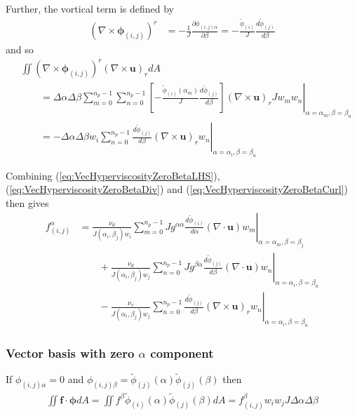 \documentclass{article}
\newcommand{\vb}{\mathbf}
\newcommand{\vg}{\boldsymbol}
\newcommand{\diff}[2]{\frac{d #1}{d #2}}
\newcommand{\pdiff}[2]{\frac{\partial #1}{\partial #2}}
\begin{document}
Further, the vortical term is defined by
\begin{align}
(\nabla \times \vg{\phi}_{(i,j)})^r &= - \frac{1}{J} \pdiff{\phi_{(i,j) \alpha}}{\beta} = - \frac{\tilde{\phi}_{(i)}}{J} \diff{\tilde{\phi}_{(j)}}{\beta}
\end{align} and so
\begin{align}
& \iint (\nabla \times \vg{\phi}_{(i,j)})^r (\nabla \times \vb{u})_r dA \nonumber \\
& \qquad = \Delta \alpha \Delta \beta \sum_{m=0}^{n_p-1} \sum_{n=0}^{n_p-1} \left. \left[- \frac{\tilde{\phi}_{(i)}(\alpha_m)}{J} \diff{\tilde{\phi}_{(j)}}{\beta} \right] (\nabla \times \vb{u})_r J w_m w_n \right\vert_{\alpha = \alpha_m, \beta = \beta_n} \\
& \qquad = - \Delta \alpha \Delta \beta w_i \sum_{n=0}^{n_p-1} \left. \diff{\tilde{\phi}_{(j)}}{\beta} (\nabla \times \vb{u})_r w_n \right\vert_{\alpha = \alpha_i, \beta = \beta_n} \label{eq:VecHyperviscosityZeroBetaCurl}
\end{align}

Combining (\ref{eq:VecHyperviscosityZeroBetaLHS}), (\ref{eq:VecHyperviscosityZeroBetaDiv}) and (\ref{eq:VecHyperviscosityZeroBetaCurl}) then gives
\begin{align}
f^\alpha_{(i,j)} &= \frac{\nu_d}{J(\alpha_i, \beta_j) w_i} \sum_{m = 0}^{n_p-1} \left. J g^{\alpha \alpha} \diff{\tilde{\phi}_{(i)}}{\alpha} (\nabla \cdot \vb{u}) w_m \right\vert_{\alpha = \alpha_m, \beta = \beta_j} \nonumber \\
& \qquad + \frac{\nu_d}{J(\alpha_i, \beta_j) w_j} \sum_{n = 0}^{n_p-1} \left. J g^{\beta \alpha} \diff{\tilde{\phi}_{(j)}}{\beta} (\nabla \cdot \vb{u}) w_n \right\vert_{\alpha = \alpha_i, \beta = \beta_n} \nonumber \\
& \qquad - \frac{\nu_v}{J(\alpha_i, \beta_j) w_j} \sum_{n=0}^{n_p-1} \left. \diff{\tilde{\phi}_{(j)}}{\beta} (\nabla \times \vb{u})_r w_n \right\vert_{\alpha = \alpha_i, \beta = \beta_n}
\end{align}

\subsubsection{Vector basis with zero $\alpha$ component}

If $\phi_{(i,j) \alpha} = 0$ and $\phi_{(i,j) \beta} = \tilde{\phi}_{(j)}(\alpha) \tilde{\phi}_{(j)}(\beta)$ then
\begin{align} \label{eq:VecHyperviscosityZeroAlphaLHS}
\iint \vb{f} \cdot \vb{\phi} dA = \iint f^\beta \tilde{\phi}_{(i)}(\alpha) \tilde{\phi}_{(j)}(\beta) dA = f^\beta_{(i,j)} w_i w_j J \Delta \alpha \Delta \beta
\end{align}
\end{document}
